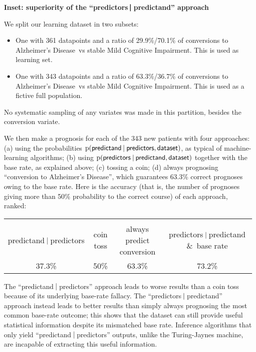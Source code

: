 \documentclass[utf8]{FrontiersinHarvard} %
\newcommand*{\amp}{\&}
\newcommand*{\p}{\mathrm{p}}%
\renewcommand*{\|}[1][]{\nonscript\:#1\vert\nonscript\:\mathopen{}}
\newcommand*{\ad}{Alzheimer's Disease}
\newcommand*{\mci}{Mild Cognitive Impairment}
\newcommand*{\tjm}{Turing-Jaynes machine}
\begin{document}
\begin{table}[!b]
  \begin{framed}
  \small
  \begin{center}
    \textbf{Inset: superiority of the \enquote{predictors$\pmb{\|}$predictand} approach}\label{tab:superiority_predictors_given_predictand}
  \end{center}
    We split our learning dataset in two subsets:
    \begin{itemize}
    \item One with 361 datapoints and a ratio of 29.9\%/70.1\% of conversions to \ad\ vs stable \mci. This is used as learning set.
    \item One with 343 datapoints and a ratio of 63.3\%/36.7\% of conversions to \ad\ vs stable \mci. This is used as a fictive full population.
    \end{itemize}
    No systematic sampling of any variates was made in this partition, besides the conversion variate.

    We then make a prognosis for each of the 343 new patients with four approaches: (a) using the probabilities $\p(\textsf{predictand} \| \textsf{predictors}, \textsf{dataset})$, as typical of machine-learning algorithms; (b) using $\p(\textsf{predictors} \| \textsf{predictand}, \textsf{dataset})$ together with the base rate, as explained above; (c) tossing a coin; (d) always prognosing \enquote{conversion to \ad}, which guarantees 63.3\% correct prognoses owing to the base rate. Here is the accuracy (that is, the number of prognoses giving more than 50\% probability to the correct course) of each approach, ranked:

    \medskip
    { 
      \centering
      \begin{tabular}{cccc}
        \hline\\[-\jot]
        {\scriptsize predictand$\|$predictors}&{\scriptsize coin toss}&{\scriptsize always predict conversion}&{\scriptsize predictors$\|$predictand \amp\ base rate}
        \\[1\jot]
        37.3\% & 50\% & 63.3\% & 73.2\%\\[\jot]
        \hline
      \end{tabular}

    }
    \medskip
    
    The \enquote{predictand$\|$predictors} approach leads to worse results than a coin toss because of its underlying base-rate fallacy. The \enquote{predictors$\|$predictand} approach instead leads to better results than simply always prognosing the most common base-rate outcome; this shows that the dataset can still provide useful statistical information despite its mismatched base rate. Inference algorithms that only yield \enquote{predictand$\|$predictors} outputs, unlike the \tjm, are incapable of extracting this useful information.
  \end{framed}
\end{table}
\end{document}
